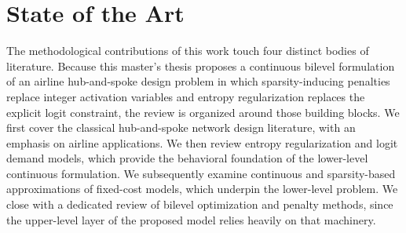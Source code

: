 \section{State of the Art}
\label{sec:state_of_art}
The methodological contributions of this work touch four distinct bodies of literature. Because this master's thesis proposes a continuous bilevel formulation of an airline hub-and-spoke design problem in which sparsity-inducing penalties replace integer activation variables and entropy regularization replaces the explicit logit constraint, the review is organized around those building blocks. We first cover the classical hub-and-spoke network design literature, with an emphasis on airline applications. We then review entropy regularization and logit demand models, which provide the behavioral foundation of the lower-level continuous formulation. We subsequently examine continuous and sparsity-based approximations of fixed-cost models, which underpin the lower-level problem. We close with a dedicated review of bilevel optimization and penalty methods, since the upper-level layer of the proposed model relies heavily on that machinery.


